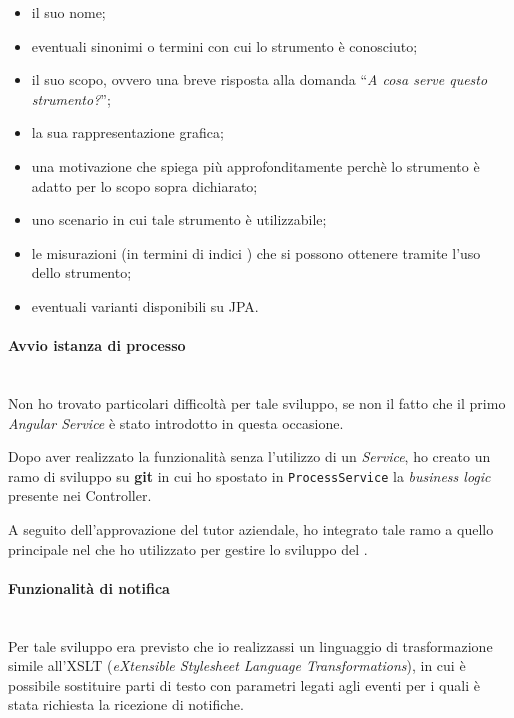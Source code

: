 \begin{itemize}
\item il suo nome;
\item eventuali sinonimi o termini con cui lo strumento è conosciuto;
\item il suo scopo, ovvero una breve risposta alla domanda ``\emph{A cosa
  serve questo strumento?}'';
\item la sua rappresentazione grafica;
\item una motivazione che spiega più approfonditamente perchè lo strumento è
  adatto per lo scopo sopra dichiarato;
\item uno scenario in cui tale strumento è utilizzabile;
\item le misurazioni (in termini di indici ) che si possono
  ottenere tramite l'uso dello strumento;
\item eventuali varianti disponibili su JPA.
\end{itemize}

\paragraph{Avvio istanza di processo} \mbox{} \\

Non ho trovato particolari difficoltà per tale sviluppo, se non il fatto che
il primo \emph{Angular Service} è stato introdotto in questa occasione.

Dopo aver realizzato la funzionalità senza l'utilizzo di un \emph{Service}, ho
creato un ramo di sviluppo su \textbf{git} in cui ho spostato in
\texttt{ProcessService} la \emph{business logic} presente nei Controller.

A seguito dell'approvazione del tutor aziendale, ho integrato tale ramo a
quello principale nel  che ho utilizzato per gestire lo
sviluppo del \FREND{}.

\paragraph{Funzionalità di notifica} \mbox{} \\

Per tale sviluppo era previsto che io realizzassi un linguaggio di
trasformazione simile all'XSLT (\emph{eXtensible Stylesheet Language
Transformations}), in cui è possibile sostituire parti di testo con parametri
legati agli eventi per i quali è stata richiesta la ricezione di notifiche.

